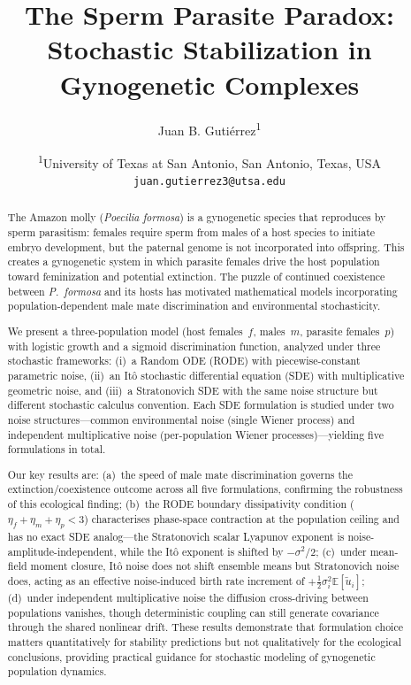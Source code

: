 \documentclass[12pt]{article}
\title{The Sperm Parasite Paradox: \\Stochastic Stabilization in Gynogenetic Complexes}
\author{Juan B. Gutiérrez\textsuperscript{1}}
\date{
  \textsuperscript{1}University of Texas at San Antonio, San Antonio, Texas, USA\\
  \texttt{juan.gutierrez3@utsa.edu}
}
\begin{document}
\maketitle

\begin{abstract}
The Amazon molly (\textit{Poecilia formosa}) is a gynogenetic species that reproduces by sperm parasitism: females require sperm from males of a host species to initiate embryo development, but the paternal genome is not incorporated into offspring.  This creates a gynogenetic system in which parasite females drive the host population toward feminization and potential extinction.  The puzzle of continued coexistence between \textit{P.~formosa} and its hosts has motivated mathematical models incorporating population-dependent male mate discrimination and environmental stochasticity.

We present a three-population model (host females~$f$, males~$m$, parasite females~$p$) with logistic growth and a sigmoid discrimination function, analyzed under three stochastic frameworks: (i)~a Random ODE (RODE) with piecewise-constant parametric noise, (ii)~an It\^{o} stochastic differential equation (SDE) with multiplicative geometric noise, and (iii)~a Stratonovich SDE with the same noise structure but different stochastic calculus convention.  Each SDE formulation is studied under two noise structures---common environmental noise (single Wiener process) and independent multiplicative noise (per-population Wiener processes)---yielding five formulations in total.

Our key results are: (a)~the speed of male mate discrimination governs the extinction/coexistence outcome across all five formulations, confirming the robustness of this ecological finding; (b)~the RODE boundary dissipativity condition ($\eta_f + \eta_m + \eta_p
< 3$) characterises phase-space contraction at the population ceiling and
has no exact SDE analog---the Stratonovich scalar Lyapunov exponent is noise-amplitude-independent, while the It\^{o} exponent is shifted by $-\sigma^2/2$; (c)~under mean-field moment closure, It\^{o} noise does not shift ensemble means but Stratonovich noise does, acting as an effective noise-induced birth rate increment of $+\tfrac{1}{2}\sigma_i^2 \mathbb{E}[\tilde{u}_i]$; (d)~under independent multiplicative noise the diffusion cross-driving between populations vanishes, though deterministic coupling can still generate covariance through the shared nonlinear drift.  These results demonstrate that formulation choice matters quantitatively for stability predictions but not qualitatively for the ecological conclusions, providing practical guidance for stochastic modeling of gynogenetic population dynamics.
\end{abstract}
\end{document}
